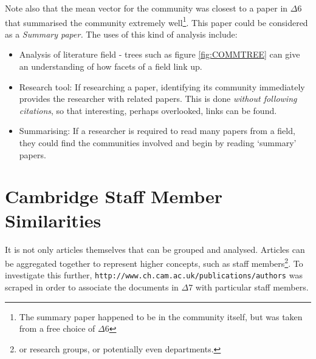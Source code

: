 \newpage
Note also that the mean vector for the community was closest to a paper in $\Delta6$ that summarised the community extremely well\footnote{The summary paper happened to be in the community itself, but was taken from a free choice of $\Delta6$ }. This paper could be considered as a \emph{Summary paper.}
The uses of this kind of analysis include:
\begin{itemize}
\item Analysis of literature field -  trees such as figure \ref{fig:COMMTREE} can give an understanding of how facets of a field link up. 
\item Research tool: If researching a paper, identifying its community immediately provides the researcher with related papers. This is done \emph{without following citations}, so that interesting, perhaps overlooked, links can be found.
\item Summarising: If a researcher is required to read many papers from a field, they could find the communities involved and begin by reading `summary' papers. 
\end{itemize}

\section{Cambridge Staff Member Similarities}
\label{sec:AUTHORCLUSTERS}

It is not only articles themselves that can be grouped and analysed. Articles can be aggregated together to represent higher concepts, such as staff members\footnote{or research groups, or potentially even departments. }. To investigate this further, \texttt{http://www.ch.cam.ac.uk/publications/authors} was scraped in order to associate the documents in $\Delta7$ with particular staff members.

